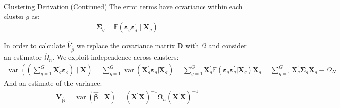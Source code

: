 \documentclass[aspectratio=169,11pt]{beamer}
\begin{document}
\begin{frame}{Clustering Derivation (Continued)}
The error terms have covariance within each cluster $g$ as:
\begin{align*}
 \boldsymbol{\Sigma}_ { g } = \mathbb { E } \left( \boldsymbol{\varepsilon} _ { g }  \boldsymbol{ \varepsilon } _ { g } ^ { \prime } \mid \boldsymbol { X } _ { g } \right)
\end{align*}

In order to calculate $\widehat{V}_{\widehat{\beta}}$ we replace the covariance matrix $\mathbf{D}$ with $\Omega$ and consider an estimator $\widehat{\Omega}_n$. We exploit \alert{independence across clusters}:
\begin{align*}
\operatorname { var } \left( \left( \sum _ { g = 1 } ^ { G } \boldsymbol { X } _ { g } ^ { \prime } \boldsymbol{\varepsilon}_{ g } \right) \mid \boldsymbol { X } \right) = \sum _ { g = 1 } ^ { G } \operatorname { var } \left( \boldsymbol { X } _ { g } ^ { \prime } \boldsymbol{\varepsilon} _ { g } | \boldsymbol { X } _ { g } \right)
= \sum _ { g = 1 } ^ { G } \boldsymbol { X } _ { g } ^ { \prime } \mathbb { E } \left( \boldsymbol{\varepsilon} _ { g } \boldsymbol{\varepsilon}_ { g } ^ { \prime } | \boldsymbol { X } _ { g } \right) \boldsymbol { X } _ { g }
= \sum _ { g = 1 } ^ { G } \boldsymbol { X } _ { g } ^ { \prime } \boldsymbol { \Sigma } _ { g } \mathbf { X } _ { g } 
 \equiv \Omega_N
\end{align*}
And an estimate of the variance:
\begin{align*}
\boldsymbol { V } _ { \widehat { \boldsymbol { \beta } } } = \operatorname { var } ( \widehat { \boldsymbol { \beta } } \mid  \boldsymbol { X } )
= \left( \mathbf { X } ^ { \prime } \mathbf { X } \right) ^ { - 1 } \boldsymbol { \Omega } _ { n } \left( \mathbf { X } ^ { \prime } \mathbf { X } \right) ^ { - 1 }
\end{align*}
\end{frame}
\end{document}
